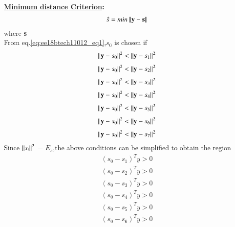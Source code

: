 \begin{enumerate}[label=\thesubsection.\arabic*.,ref=\thesubsection.\theenumi]
\textbf{\underline{Minimum distance Criterion}:}
\begin{align}
    \hat{s} = min \left\lVert\textbf{y} - \textbf{s}\right\rVert
    \label{eq:ee18btech11012_eq1}
\end{align}
where \textbf{s} \\
From eq.\ref{eq:ee18btech11012_eq1},\textbf{$s_{0}$} is chosen if
\begin{align}
    \left\lVert\textbf{y}-\textbf{$s_{0}$}\right\rVert^2 < \left\lVert\textbf{y}-\textbf{$s_{1}$}\right\rVert^2
\end{align}
\begin{align}
    \left\lVert\textbf{y}-\textbf{$s_{0}$}\right\rVert^2 < \left\lVert\textbf{y}-\textbf{$s_{2}$}\right\rVert^2
\end{align}
\begin{align}
    \left\lVert\textbf{y}-\textbf{$s_{0}$}\right\rVert^2 < \left\lVert\textbf{y}-\textbf{$s_{3}$}\right\rVert^2
\end{align}
\begin{align}
    \left\lVert\textbf{y}-\textbf{$s_{0}$}\right\rVert^2 < \left\lVert\textbf{y}-\textbf{$s_{4}$}\right\rVert^2
\end{align}
\begin{align}
    \left\lVert\textbf{y}-\textbf{$s_{0}$}\right\rVert^2 < \left\lVert\textbf{y}-\textbf{$s_{5}$}\right\rVert^2
\end{align}
\begin{align}
    \left\lVert\textbf{y}-\textbf{$s_{0}$}\right\rVert^2 < \left\lVert\textbf{y}-\textbf{$s_{6}$}\right\rVert^2
\end{align}
\begin{align}
    \left\lVert\textbf{y}-\textbf{$s_{0}$}\right\rVert^2 < \left\lVert\textbf{y}-\textbf{$s_{7}$}\right\rVert^2
\end{align}
Since $\left\lVert s_{i}\right\rVert^2$ = $E_{s}$,the above conditions can be simplified to obtain the region
\begin{align}
    (s_{0}-s_{1})^Ty>0
\end{align}
\begin{align}
    (s_{0}-s_{2})^Ty>0
\end{align}
\begin{align}
    (s_{0}-s_{3})^Ty>0
\end{align}
\begin{align}
    (s_{0}-s_{4})^Ty>0
\end{align}
\begin{align}
    (s_{0}-s_{5})^Ty>0
\end{align}
\begin{align}
    (s_{0}-s_{6})^Ty>0
\end{align}
\begin{align}

\end{align}
\end{enumerate}
